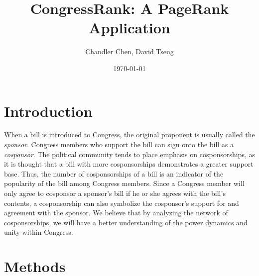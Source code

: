 \documentclass[11pt]{article}
\begin{document}
\title{CongressRank: A PageRank Application}
\author{Chandler Chen, David Tseng}
\date{\today}
\maketitle

\section*{Introduction}
When a bill is introduced to Congress, the original proponent is usually called the \textit{sponsor}. Congress members who support the bill can sign onto the bill as a \textit{cosponsor}. The political community tends to place emphasis on cosponsorships, as it is thought that a bill with more cosponsorships demonstrates a greater support base. Thus, the number of cosponsorships of a bill is an indicator of the popularity of the bill among Congress members. Since a Congress member will only agree to cosponsor a sponsor's bill if he or she agrees with the bill's contents, a cosponsorship can also symbolize the cosponsor's support for and agreement with the sponsor. We believe that by analyzing the network of cosponsorships, we will have a better understanding of the power dynamics and unity within Congress. 




\section*{Methods}
\end{document}
